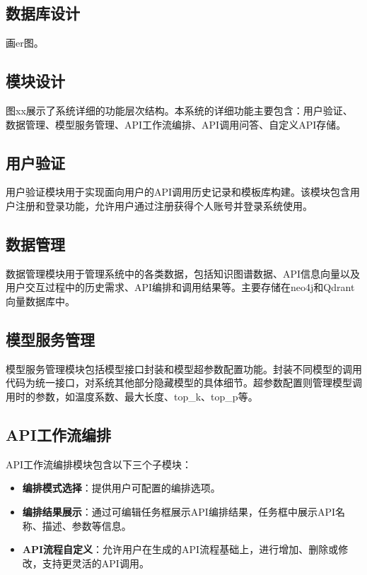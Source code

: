 \subsection{数据库设计}

画er图。

\subsection{模块设计}

图xx展示了系统详细的功能层次结构。本系统的详细功能主要包含：用户验证、数据管理、模型服务管理、API工作流编排、API调用问答、自定义API存储。

\subsection{用户验证}
用户验证模块用于实现面向用户的API调用历史记录和模板库构建。该模块包含用户注册和登录功能，允许用户通过注册获得个人账号并登录系统使用。

\subsection{数据管理}
数据管理模块用于管理系统中的各类数据，包括知识图谱数据、API信息向量以及用户交互过程中的历史需求、API编排和调用结果等。主要存储在neo4j和Qdrant向量数据库中。

\subsection{模型服务管理}
模型服务管理模块包括模型接口封装和模型超参数配置功能。封装不同模型的调用代码为统一接口，对系统其他部分隐藏模型的具体细节。超参数配置则管理模型调用时的参数，如温度系数、最大长度、top\_k、top\_p等。

\subsection{API工作流编排}
API工作流编排模块包含以下三个子模块：
\begin{itemize}
    \item \textbf{编排模式选择}：提供用户可配置的编排选项。
    \item \textbf{编排结果展示}：通过可编辑任务框展示API编排结果，任务框中展示API名称、描述、参数等信息。
    \item \textbf{API流程自定义}：允许用户在生成的API流程基础上，进行增加、删除或修改，支持更灵活的API调用。
\end{itemize}


